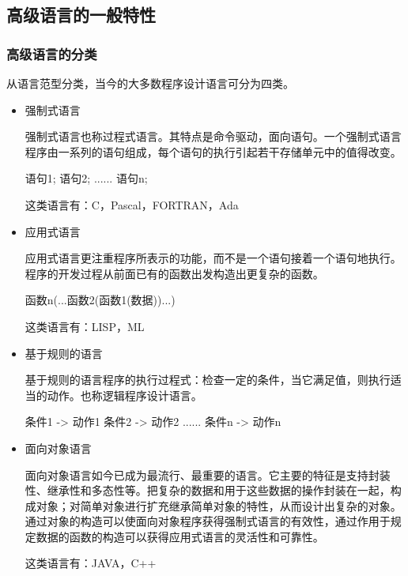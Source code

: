 \subsection{高级语言的一般特性}
\subsubsection{高级语言的分类}

从语言范型分类，当今的大多数程序设计语言可分为四类。
\begin{itemize}
    \item 强制式语言
    
    强制式语言也称过程式语言。其特点是命令驱动，面向语句。一个强制式语言程序由一系列的语句组成，每个语句的执行引起若干存储单元中的值得改变。
    
    \begin{C++}
        语句1;
        语句2;
        ......
        语句n;
    \end{C++}

    这类语言有：C，Pascal，FORTRAN，Ada

    \item 应用式语言
    
    应用式语言更注重程序所表示的功能，而不是一个语句接着一个语句地执行。程序的开发过程从前面已有的函数出发构造出更复杂的函数。

    \begin{C++}
        函数n(...函数2(函数1(数据))...)
    \end{C++}

    这类语言有：LISP，ML
    \item 基于规则的语言
    
    基于规则的语言程序的执行过程式：检查一定的条件，当它满足值，则执行适当的动作。也称逻辑程序设计语言。

    \begin{C++}
        条件1 -> 动作1
        条件2 -> 动作2
        ......
        条件n -> 动作n
    \end{C++}

    \item 面向对象语言
    
    面向对象语言如今已成为最流行、最重要的语言。它主要的特征是支持封装性、继承性和多态性等。把复杂的数据和用于这些数据的操作封装在一起，构成对象；对简单对象进行扩充继承简单对象的特性，从而设计出复杂的对象。通过对象的构造可以使面向对象程序获得强制式语言的有效性，通过作用于规定数据的函数的构造可以获得应用式语言的灵活性和可靠性。

    这类语言有：JAVA，C++
\end{itemize}

